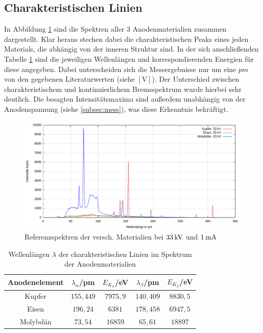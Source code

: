 \documentclass[numbers=noenddot,12pt,a4paper]{scrartcl}
\newcommand{\num}[1]{$\left[\text{#1}\right]$}
\begin{document}
\subsection{Charakteristischen Linien}
In Abbildung \ref{tab:charak} sind die Spektren aller 3 Anodenmaterialien zusammen dargestellt. Klar heraus stechen dabei die charakteristischen Peaks eines jeden Materials, die abhängig von der inneren Struktur sind. In der sich anschließenden Tabelle \ref{tab:charak} sind die jeweiligen Wellenlängen und korrespondierenden Energien für diese angegeben. Dabei unterscheiden sich die Messergebnisse nur um eine $\unit{pm}$ von den gegebenen Literaturwerten (siehe \num{V}). Der Unterschied zwischen charakteristischem und kontinuierlichem Bremsspektrum wurde hierbei sehr deutlich. Die besagten Intensitätsmaxima sind außerdem unabhängig von der Anodenspannung (siehe \ref{subsec:mess}), was diese Erkenntnis bekräftigt.
\begin{figure}[H]
	\centering
	\includegraphics[width=\textwidth]{spektren.pdf}
	\caption{Referenzspektren der versch. Materialien bei $\unit[33]{kV}$ und $\unit[1]{mA}$}\label{img:refere}
\end{figure}
\begin{table}[H]
	\centering
	\begin{tabular}{c|c|c|c|c}
		Anodenelement & $\lambda_\alpha$/pm & $E_{K_{\alpha}}$/eV & $\lambda_{\beta}$/pm & $E_{K_{\beta}}$/eV \\ \hline
		Kupfer & $155,449$ & $7975,9$ & $140,409$ & $8830,5$ \\ \hline
		Eisen & $196,24$ & $6381$ & $178,458$ & $6947,5$ \\ \hline
		Molybdän & $73,54$ & $16859$ & $65,61$ & $18897$ \\ \hline
	\end{tabular}
	\caption{Wellenlängen $\lambda$ der charakteristischen Linien im Spektrum der Anodenmaterialien}\label{tab:charak}
\end{table}
\end{document}
